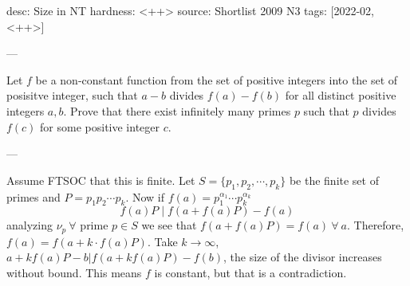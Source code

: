 desc: Size in NT
hardness: <++>
source: Shortlist 2009 N3
tags: [2022-02, <++>]

---

Let $f$ be a non-constant function from the set of positive integers into the set of posisitve integer, 
such that $a-b$ divides $f(a) - f(b)$ for all distinct positive integers $a,b$. Prove that there exist
infinitely many primes $p$ such that $p$ divides $f(c)$ for some positive integer $c$.

---

Assume FTSOC that this is finite. Let $S = \{p_1,p_2,\cdots,p_k\}$ be the finite set of primes
  and $P = p_1p_2 \cdots p_k$. Now if $f(a) = p_1^{\alpha_1} \cdots p_k^{\alpha_k}$ 
  \[f(a) P \mid f(a + f(a) P) - f(a)\] analyzing $\nu_p \ \forall $ prime $p \in S$ we see that
  $f(a + f(a)P) = f(a) \ \forall \ a$. Therefore, $f(a) = f(a + k\cdot f(a) P)$.
  Take $k \to \infty$, $a+kf(a)P - b | f(a+kf(a)P) - f(b)$,
  the size of the divisor increases without bound. This means $f$ is constant, but that is a contradiction.
